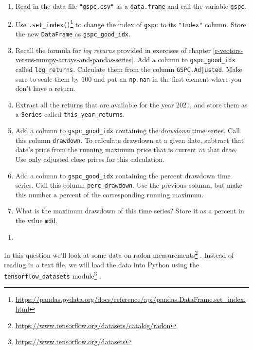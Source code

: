 \documentclass[
  12pt,
  krantz2]{krantz}
\providecommand{\tightlist}{%
  \setlength{\itemsep}{0pt}\setlength{\parskip}{0pt}}
\renewcommand{\href}[2]{#2\footnote{\url{#1}}}
\begin{document}
\begin{enumerate}
\def\labelenumi{\alph{enumi})}
\tightlist
\item
  Read in the data file \texttt{"gspc.csv"} as a \texttt{data.frame} and call the variable \texttt{gspc}.
\item
  Use \href{https://pandas.pydata.org/docs/reference/api/pandas.DataFrame.set_index.html}{\texttt{.set\_index()}} to change the index of \texttt{gspc} to its \texttt{"Index"} column. Store the new \texttt{DataFrame} as \texttt{gspc\_good\_idx}.
\item
  Recall the formula for \emph{log returns} provided in exercises of chapter \ref{r-vectors-versus-numpy-arrays-and-pandas-series}. Add a column to \texttt{gspc\_good\_idx} called \texttt{log\_returns}. Calculate them from the column \texttt{GSPC.Adjusted}. Make sure to scale them by \(100\) and put an \texttt{np.nan} in the first element where you don't have a return.
\item
  Extract all the returns that are available for the year 2021, and store them as a \texttt{Series} called \texttt{this\_year\_returns}.
\item
  Add a column to \texttt{gspc\_good\_idx} containing the \emph{drawdown} time series. Call this column \texttt{drawdown}. To calculate drawdown at a given date, subtract that date's price from the running maximum price that is current at that date. Use only adjusted close prices for this calculation.\\
\item
  Add a column to \texttt{gspc\_good\_idx} containing the percent drawdown time series. Call this column \texttt{perc\_drawdown}. Use the previous column, but make this number a percent of the corresponding running maximum.
\item
  What is the maximum drawdown of this time series? Store it as a percent in the value \texttt{mdd}.
\end{enumerate}

\begin{enumerate}
\def\labelenumi{\arabic{enumi}.}
\setcounter{enumi}{1}
\tightlist
\item
\end{enumerate}

In this question we'll look at \href{https://www.tensorflow.org/datasets/catalog/radon}{some data on radon measurements} \citep{GelmanHill:2007}. Instead of reading in a text file, we will load the data into Python using the \href{https://www.tensorflow.org/datasets}{\texttt{tensorflow\_datasets} module} \citep{TFDS}.
\end{document}
